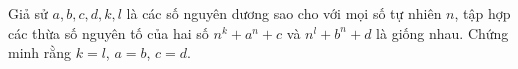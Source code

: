 \ifshowproblem
\begin{problem}\label{example:IRN-2015-MO3-NP4}
	Giả sử $a, b, c, d, k, l$ là các số nguyên dương sao cho với mọi số tự nhiên $n$,
	tập hợp các thừa số nguyên tố của hai số $n^k + a^n + c$ và $n^l + b^n + d$ là giống nhau.  
	Chứng minh rằng $k = l$, $a = b$, $c = d$.
\end{problem}
\fi

\footnotemark
{}
\fi